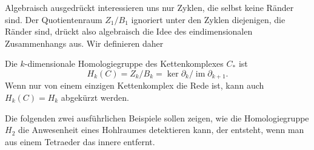 Algebraisch ausgedrückt interessieren uns nur Zyklen, die selbst
keine Ränder sind.
Der Quotientenraum $Z_1/B_1$ ignoriert unter den Zyklen diejenigen, die
Ränder sind, drückt also algebraisch die Idee des eindimensionalen
Zusammenhangs aus.
Wir definieren daher

\begin{definition}
Die $k$-dimensionale Homologiegruppe des Kettenkomplexes $C_*$ ist
\[
H_k(C) = Z_k/B_k = \ker \partial_k / \operatorname{im} \partial_{k+1}.
\]
Wenn nur von einem einzigen Kettenkomplex die Rede ist, kann auch $H_k(C)=H_k$
abgekürzt werden.
\end{definition}


Die folgenden zwei ausführlichen Beispiele sollen zeigen, wie die
Homologiegruppe $H_2$ die Anwesenheit eines Hohlraumes detektieren kann,
der entsteht, wenn man aus einem Tetraeder das innere entfernt.


